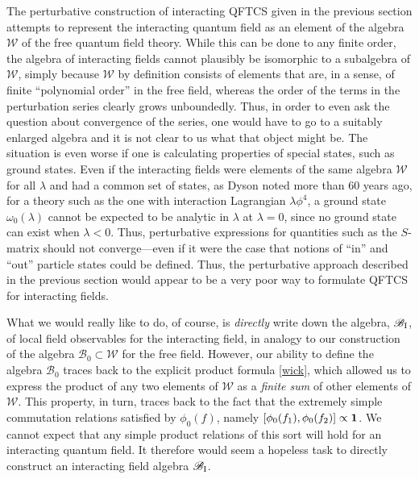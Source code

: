 \documentclass[12pt]{article}
\newcommand{\rI}{{\rm I}}
\newcommand{\eB}{\mathscr{B}}
\newcommand{\eW}{\mathscr{W}}
\newcommand{\myid}{{\bf 1}}
\theoremstyle{plain}
\theoremstyle{definition}
\begin{document}
The perturbative construction of interacting QFTCS given in the previous section attempts to represent the interacting quantum field as an element of the algebra $\eW$ of the free quantum field theory. While this can be done to any finite order, the algebra of interacting fields cannot plausibly be isomorphic to a subalgebra of $\eW$, simply because $\eW$ by definition consists of
elements that are, in a sense, of finite ``polynomial order'' in the free field, whereas the order of the terms in the perturbation series clearly grows unboundedly. Thus, in order to even ask the
question about convergence of the series, one would have to go to a suitably enlarged algebra and it is not clear to us what that object might be. The situation is even worse if one is calculating properties of special states, such as ground states. Even if the interacting fields were elements of the same algebra $\eW$ for all $\lambda$ and had a common set of states, as Dyson noted more than 60 years ago, for a theory such as the one with interaction Lagrangian $\lambda \phi^4$, a ground state $\omega_0 (\lambda)$ cannot be expected to be analytic in $\lambda$ at $\lambda = 0$, since no ground state can exist when $\lambda < 0$. Thus, perturbative expressions for quantities such as the $S$-matrix should not
converge---even if it were the case that notions of ``in'' and ``out'' particle states could be defined. Thus, the perturbative approach described in the previous section would appear to be a very poor way to formulate QFTCS for interacting fields.

What we would really like to do, of course, is {\em directly} write down the algebra, $\eB_\rI$, of local field observables for the interacting field, in analogy to our construction of the algebra $\eB_0 \subset \eW$ for the free field. However, our ability to define the algebra $\eB_0$ traces back to the explicit product formula \eqref{wick}, which allowed us to express the product of any two
elements of $\eW$ as a {\it finite sum} of other elements of $\eW$. This property, in turn, traces back to the fact that
the extremely simple commutation relations satisfied by $\phi_0(f)$, namely $[\phi_0(f_1), \phi_0(f_2)] \propto \myid$. We cannot expect that any simple product relations of this sort will hold for an interacting quantum field. It therefore would
seem a hopeless task to directly construct an interacting field algebra $\eB_\rI$.
\end{document}
